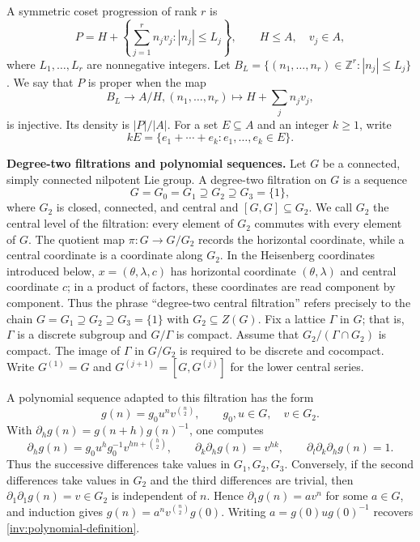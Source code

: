 \documentclass[twoside]{aomart}
\theoremstyle{paperplain}
\theoremstyle{paperdefinition}
\numberwithin{equation}{section}
\begin{document}
A symmetric coset progression of rank $r$ is
\begin{equation*}
 P=H+\left\{\sum_{j=1}^r n_jv_j:|n_j|\le L_j\right\},
 \qquad H\le A,\quad v_j\in A,
\end{equation*}
where $L_1,\ldots,L_r$ are nonnegative integers. Let
$B_L=\{(n_1,\ldots,n_r)\in\mathbb Z^r:|n_j|\le L_j\}$. We say that
$P$ is proper when the map
$$B_L\to A/H, (n_1,\ldots,n_r)\mapsto H+\sum_j n_jv_j,$$
is injective. Its density is $|P|/|A|$. For a set
$E\subseteq A$ and an integer $k\ge1$, write
\[
 kE=\{e_1+\cdots+e_k:e_1,\ldots,e_k\in E\}.
\]

\medskip
\noindent\textbf{Degree-two filtrations and polynomial sequences.}
Let $G$ be a connected, simply connected nilpotent Lie group. A
degree-two filtration on $G$ is a sequence
\[
 G=G_0=G_1\supseteq G_2\supseteq G_3=\{1\},
\]
where $G_2$ is closed, connected, and central and
$[G,G]\subseteq G_2$.  We call $G_2$ the central level of the
filtration: every element of $G_2$ commutes with every element of $G$.
The quotient map
$\pi:G\to G/G_2$ records the horizontal coordinate, while a central
coordinate is a coordinate along $G_2$.  In the Heisenberg coordinates
introduced below, $x=(\theta,\lambda,c)$ has horizontal coordinate
$(\theta,\lambda)$ and central coordinate $c$; in a product of factors,
these coordinates are read component by component.  Thus the phrase
``degree-two central filtration'' refers precisely to the chain
$G=G_1\supseteq G_2\supseteq G_3=\{1\}$ with $G_2\subseteq Z(G)$.
Fix a lattice $\Gamma$ in $G$; that is,
$\Gamma$ is a discrete subgroup and $G/\Gamma$ is compact.
Assume that $G_2/(\Gamma\cap G_2)$ is compact. The image of $\Gamma$
in $G/G_2$ is required to be discrete and cocompact.
Write
$G^{(1)}=G$ and $G^{(j+1)}=[G,G^{(j)}]$ for the lower central series.

A polynomial sequence adapted to this filtration has the form
\begin{equation}
 g(n)=g_0u^nv^{\binom n2},
 \qquad g_0,u\in G,\quad v\in G_2.
 \label{inv:polynomial-definition}
\end{equation}
With $\partial_hg(n)=g(n+h)g(n)^{-1}$, one computes
\begin{equation*}
 \partial_hg(n)=g_0u^hg_0^{-1}v^{hn+\binom h2},\qquad
 \partial_k\partial_hg(n)=v^{hk},\qquad
 \partial_l\partial_k\partial_hg(n)=1.
\end{equation*}
Thus the successive differences take values in $G_1,G_2,G_3$.
Conversely, if the second differences take values in $G_2$ and the
third differences are trivial, then
$\partial_1\partial_1g(n)=v\in G_2$ is independent of $n$.
Hence $\partial_1g(n)=av^n$ for some $a\in G$, and induction gives
$g(n)=a^nv^{\binom n2}g(0)$. Writing
$a=g(0)ug(0)^{-1}$ recovers \eqref{inv:polynomial-definition}.
\end{document}
